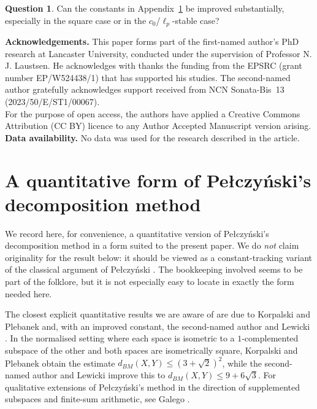 \documentclass[11pt]{amsart}
\theoremstyle{plain}
\theoremstyle{definition}
\newtheorem{question}[theorem]{Question}
\numberwithin{equation}{section}
\renewcommand{\le}{\leqslant}
\begin{document}
\begin{question}
Can the constants in Appendix~\ref{app:quant-pelc} be improved substantially, especially in the square case or in the $c_0$/$\ell_p$-stable case?
\end{question}



\bigskip
\noindent\textbf{Acknowledgements.} This paper forms part of the first-named author's PhD research at Lancaster University, conducted under the supervision of Professor N. J. Laustsen. He acknowledges with thanks the funding from the EPSRC (grant number EP/W524438/1) that has supported his studies. The second-named author gratefully acknowledges support received from NCN Sonata-Bis~13 (2023/50/E/ST1/00067).\\

For the purpose of open access, the authors have applied a Creative Commons Attribution (CC BY) licence to any Author Accepted Manuscript version arising. \\

\noindent\textbf{Data availability.} No data was used for the research described in the article.

\newpage

\appendix
\section{A quantitative form of Pe{\l}czy\'nski's decomposition method}\label{app:quant-pelc}

We record here, for convenience, a quantitative version of Pe{\l}czy\'nski's decomposition method in a form suited to the present paper.
We do \emph{not} claim originality for the result below: it should be viewed as a constant-tracking variant of the classical argument of Pe{\l}czy\'nski \cite{Pelczynski1960}.
The bookkeeping involved seems to be part of the folklore, but it is not especially easy to locate in exactly the form needed here.

The closest explicit quantitative results we are aware of are due to Korpalski and Plebanek \cite[Theorem~5.1]{KorpalskiPlebanek2025} and, with an improved constant, the second-named author and Lewicki \cite[Theorem~B; Theorem~5.1]{KaniaLewicki2026}.
In the normalised setting where each space is isometric to a $1$-complemented subspace of the other and both spaces are isometrically square, Korpalski and Plebanek obtain the estimate $d_{BM}(X,Y)\le (3+\sqrt2)^2$, while the second-named author and Lewicki improve this to $d_{BM}(X,Y)\le 9+6\sqrt3$.
For qualitative extensions of Pe{\l}czy\'nski's method in the direction of supplemented subspaces and finite-sum arithmetic, see Galego \cite{Galego2007,Galego2008}.
\end{document}
